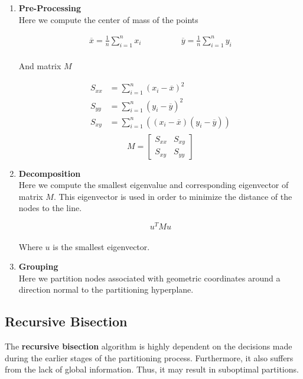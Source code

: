 \documentclass{article}
\begin{document}
\begin{enumerate}
	\item \textbf{Pre-Processing}
	\vspace{.2cm} \\
	Here we compute the center of mass of the points
	
	\begin{equation*}
 		\begin{split}
    		\overline{x} = \frac{1}{n} \sum^n_{i = 1}x_i
  		\end{split}
		\quad\quad\quad\quad
  		\begin{split}
    		\overline{y} = \frac{1}{n} \sum^n_{i = 1}y_i
  		\end{split}
	\end{equation*} \\
	And matrix $M$
	
	\begin{align*}
		S_{xx} &= \sum^n_{i=1} \left( x_i - \overline{x} \right)^2 \\
		S_{yy} &= \sum^n_{i=1} \left( y_i - \overline{y} \right)^2 \\
		S_{xy} &= \sum^n_{i=1} \left( (x_i - \overline{x}) (y_i - \overline{y}) \right) \\
	\end{align*}
	\[ M = \begin{bmatrix} S_{xx} & S_{xy} \\ S_{xy} & S_{yy} \end{bmatrix}	\]
	
	\item \textbf{Decomposition}
	\vspace{.2cm} \\
	Here we compute the smallest eigenvalue and corresponding eigenvector of matrix $M$. This eigenvector is used in order to minimize the distance of the nodes to the line.
	
	\[ u^T M u \] \\
	Where $u$ is the smallest eigenvector.
	
	\item \textbf{Grouping}
	\vspace{.2cm} \\
	Here we partition nodes associated with geometric coordinates around a direction normal to the partitioning hyperplane.
\end{enumerate}

\subsection{Recursive Bisection}
The \textbf{recursive bisection} algorithm is highly dependent on the decisions made during the earlier stages of the partitioning process. Furthermore, it also suffers from the lack of global information. Thus, it may result in suboptimal partitions.
\end{document}

